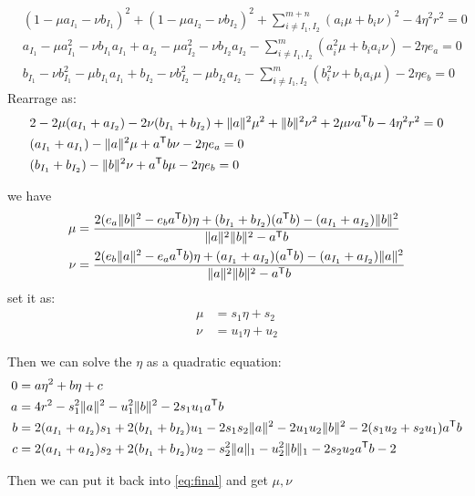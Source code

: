 \begin{equation}
\begin{split} 
  & (1-\mu a_{I_1}-\nu b_{I_1})^2 + (1-\mu a_{I_2}-\nu b_{I_2})^2 + \sum^{m+n}_{i\neq I_1,I_2}(a_i\mu+b_i\nu)^2 - 4\eta^2 r^2 = 0 \\
  & a_{I_1}-\mu a_{I_1}^2-\nu b_{I_1}a_{I_1} + a_{I_2}-\mu a_{I_2}^2-\nu b_{I_2}a_{I_2} - \sum^{m}_{i\neq I_1,I_2}(a_i^2\mu +b_i a_i\nu) - 2\eta {e_a} = 0 \\
  & b_{I_1}-\nu b_{I_1}^2-\mu b_{I_1}a_{I_1} + b_{I_2}-\nu b_{I_2}^2-\mu b_{I_2}a_{I_2} - \sum^{m}_{i\neq I_1,I_2}(b_i^2\nu +b_i a_i\mu) - 2\eta {e_b} = 0 
 \end{split}
\end{equation}
Rearrage as:
\begin{equation}
\begin{split} 
  & 2-2\mu (a_{I_1}+a_{I_2})-2\nu(b_{I_1}+b_{I_2})+  \|a\|^2\mu^2+\|b\|^2\nu^2+2\mu\nu a^{\mathsf T}b - 4\eta^2 r^2 = 0 \\
  & (a_{I_1}+ a_{I_1}) -  \|a\|^2\mu + a^{\mathsf T}b\nu - 2\eta {e_a} = 0 \\
  & (b_{I_1}+ b_{I_2}) - \|b\|^2\nu +a^{\mathsf T}b \mu - 2\eta {e_b} = 0 
 \end{split}
\end{equation}

we have 
\begin{equation}
\begin{split} 
\mu &= \frac{2( e_a\|b\|^2 -  e_ba^{\mathsf T}b )\eta + (b_{I_1} + b_{I_2}) (a^{\mathsf T}b) - (a_{I_1}+a_{I_2}) \|b\|^2}{ \|a\|^2 \|b\|^2 -a^{\mathsf T}b}\\
\nu  &=\frac{2( e_b\|a\|^2 -  e_aa^{\mathsf T}b )\eta + (a_{I_1} + a_{I_2}) (a^{\mathsf T}b) - (a_{I_1}+a_{I_2}) \|a\|^2}{ \|a\|^2 \|b\|^2 -a^{\mathsf T}b}\\
 \end{split}
\end{equation}
set it as:
\begin{equation}
\begin{split} 
\mu &= s_1 \eta + s_2\\ 
\nu  &= u_1 \eta + u_2
 \end{split}
 \label{eq:final}
\end{equation}

Then we can solve the $\eta$ as a quadratic equation:
\begin{equation}
\begin{split} 
0&=a\eta^2+b\eta+c\\
 a&= 4r^2 - s_1^2\|a\|^2 - u_1^2\|b\|^2 -2s_1 u_1a^{\mathsf T}b\\
b&=2(a_{I_1} + a_{I_2})s_1 +2(b_{I_1} + b_{I_2})u_1 - 2s_1s_2 \|a\|^2 - 2u_1u_2\|b\|^2 - 2(s_1u_2+s_2u_1)a^{\mathsf T}b  \\
 c&=2(a_{I_1} + a_{I_2})s_2 +2(b_{I_1} + b_{I_2})u_2 -s_2^2\|a\|_1 -u_2^2\|b\|_1 - 2s_2u_2a^{\mathsf T}b -2
 \end{split}
\end{equation}

Then we can put it back into \ref{eq:final} and get $\mu, \nu$
